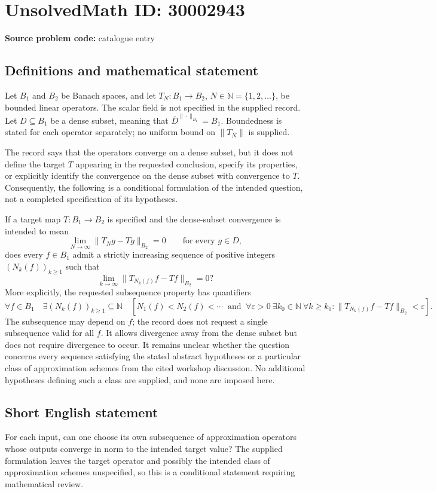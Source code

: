 \documentclass[11pt]{article}
\newcommand{\N}{\mathbb{N}}
\begin{document}
\section*{UnsolvedMath ID: 30002943}
\textbf{Source problem code:} catalogue entry
\subsection{Definitions and mathematical statement}
Let \(B_1\) and \(B_2\) be Banach spaces, and let \(T_N:B_1\to B_2\), \(N\in\N=\{1,2,\ldots\}\), be bounded linear operators. The scalar field is not specified in the supplied record. Let \(D\subseteq B_1\) be a dense subset, meaning that \(\overline D^{\|\cdot\|_{B_1}}=B_1\). Boundedness is stated for each operator separately; no uniform bound on \(\|T_N\|\) is supplied.

The record says that the operators converge on a dense subset, but it does not define the target \(T\) appearing in the requested conclusion, specify its properties, or explicitly identify the convergence on the dense subset with convergence to \(T\). Consequently, the following is a conditional formulation of the intended question, not a completed specification of its hypotheses.

If a target map \(T:B_1\to B_2\) is specified and the dense-subset convergence is intended to mean
\[
\lim_{N\to\infty}\|T_Ng-Tg\|_{B_2}=0
\qquad\text{for every }g\in D,
\]
does every \(f\in B_1\) admit a strictly increasing sequence of positive integers \((N_k(f))_{k\geq1}\) such that
\[
\lim_{k\to\infty}\|T_{N_k(f)}f-Tf\|_{B_2}=0?
\]
More explicitly, the requested subsequence property has quantifiers
\[
\forall f\in B_1\quad
\exists (N_k(f))_{k\geq1}\subseteq\N\quad
\left[N_1(f)<N_2(f)<\cdots\ \text{ and }\
\forall\varepsilon>0\ \exists k_0\in\N\ \forall k\geq k_0:
\|T_{N_k(f)}f-Tf\|_{B_2}<\varepsilon\right].
\]
The subsequence may depend on \(f\); the record does not request a single subsequence valid for all \(f\). It allows divergence away from the dense subset but does not require divergence to occur. It remains unclear whether the question concerns every sequence satisfying the stated abstract hypotheses or a particular class of approximation schemes from the cited workshop discussion. No additional hypotheses defining such a class are supplied, and none are imposed here.
\subsection{Short English statement}
For each input, can one choose its own subsequence of approximation operators whose outputs converge in norm to the intended target value? The supplied formulation leaves the target operator and possibly the intended class of approximation schemes unspecified, so this is a conditional statement requiring mathematical review.
\end{document}
